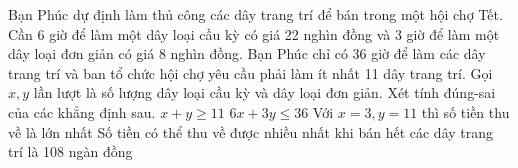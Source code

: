 \begin{ex}
 Bạn Phúc dự định làm thủ công các dây trang trí để bán trong một hội chợ Tết. Cần 6 giờ để làm một dây loại cầu kỳ có giá 22 nghìn đồng và 3 giờ để làm một dây loại đơn giản có giá 8 nghìn đồng. Bạn Phúc chỉ có 36 giờ để làm các dây trang trí và ban tổ chức hội chợ yêu cầu phải làm ít nhất 11 dây trang trí. Gọi ${x,y}$ lần lượt là số lượng dây loại cầu kỳ và dây loại đơn giản. Xét tính đúng-sai của các khẳng định sau. 
\choiceTFt
{ \True  $x+y \ge 11$ }
   { \True   $6x+3y \le 36$ }
     { Với $x = 3, y = 11$ thì số tiền thu về là lớn nhất }
    { Số tiền có thể thu về được nhiều nhất khi bán hết các dây trang trí là 108 ngàn đồng }
\end{ex}

